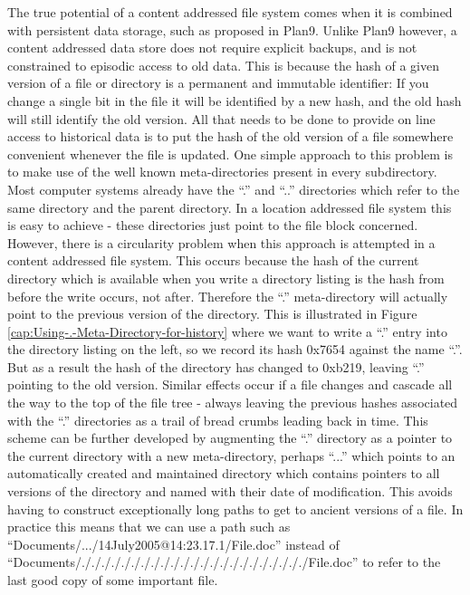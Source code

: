 \documentclass[british,english]{article}
\begin{document}
The true potential of a content addressed file system comes when it
is combined with persistent data storage, such as proposed in Plan9.
Unlike Plan9 however, a content addressed data store does not require
explicit backups, and is not constrained to episodic access to old
data. This is because the hash of a given version of a file or directory
is a permanent and immutable identifier: If you change a single bit
in the file it will be identified by a new hash, and the old hash
will still identify the old version. All that needs to be done to
provide on line access to historical data is to put the hash of the
old version of a file somewhere convenient whenever the file is updated.
One simple approach to this problem is to make use of the well known
meta-directories present in every subdirectory. Most computer systems
already have the {}``.'' and {}``..'' directories which refer
to the same directory and the parent directory. In a location addressed
file system this is easy to achieve - these directories just point
to the file block concerned. However, there is a circularity problem
when this approach is attempted in a content addressed file system.
This occurs because the hash of the current directory which is available
when you write a directory listing is the hash from before the write
occurs, not after. Therefore the {}``.'' meta-directory will actually
point to the previous version of the directory. This is illustrated
in Figure \ref{cap:Using-.-Meta-Directory-for-history} where we want
to write a {}``.'' entry into the directory listing on the left,
so we record its hash 0x7654 against the name {}``.''. But as a
result the hash of the directory has changed to 0xb219, leaving {}``.''
pointing to the old version. Similar effects occur if a file changes
and cascade all the way to the top of the file tree - always leaving
the previous hashes associated with the {}``.'' directories as a
trail of bread crumbs leading back in time. This scheme can be further
developed by augmenting the {}``.'' directory as a pointer to the
current directory with a new meta-directory, perhaps {}``...'' which
points to an automatically created and maintained directory which
contains pointers to all versions of the directory and named with
their date of modification. This avoids having to construct exceptionally
long paths to get to ancient versions of a file. In practice this
means that we can use a path such as {}``Documents/.../14July2005@14:23.17.1/File.doc''
instead of {}``Documents/./././././././././././././././././././././././File.doc''
to refer to the last good copy of some important file.
\end{document}
